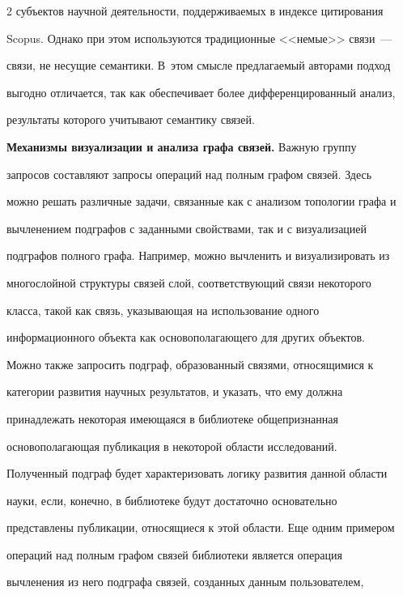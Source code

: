 \begin{multicols}{2}
субъектов научной деятельности, поддерживаемых в индексе цитирования 


Scopus. Однако при этом используются традиционные <<немые>> связи~--- 


связи, не несущие семантики. В~этом смысле пред\-ла\-га\-емый авторами подход 


выгодно отличается, так как обеспечивает более дифференцированный анализ, 


результаты которого учитывают семантику связей. 


  


  \smallskip


  


  \textbf{Механизмы визуализации и анализа графа связей.} Важную группу 


запросов составляют запросы операций над полным графом связей. Здесь 


можно решать различные задачи, связанные как с анализом топологии графа и 


вычленением подграфов с заданными свойствами, так и с визуализацией 


подграфов полного графа. Например, можно вычленить и визуализировать из 


многослойной структуры связей слой, соответствующий связи некоторого 


класса, такой как связь, указывающая на использование одного 


информационного объекта как основополагающего для других объектов. 


Можно также запросить подграф, образованный связями, относящимися к 


категории развития научных результатов, и указать, что ему должна 


принадлежать некоторая имеющаяся в библиотеке общепризнанная 


основополагающая публикация в некоторой области исследований. 


Полученный подграф будет характеризовать логику развития данной области 


науки, если, конечно, в библиотеке будут достаточно основательно 


представлены публикации, относящиеся к этой области. Еще одним примером 


операций над полным графом связей библиотеки является операция 


вычленения из него подграфа связей, созданных данным пользователем, 



\end{multicols}
